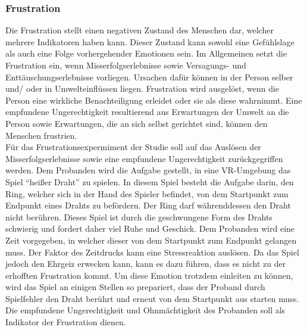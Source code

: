 \subsubsection{Frustration} \label{frust-4}




Die Frustration stellt einen negativen Zustand des Menschen dar, welcher mehrere Indikatoren haben kann. Dieser Zustand kann sowohl eine Gefühlslage als auch eine Folge vorhergehender Emotionen sein.
Im Allgemeinen setzt die Frustration ein, wenn Misserfolgserlebnisse sowie Versagungs- und Enttäuschungserlebnisse vorliegen. Ursachen dafür können in der Person selber und/ oder in Umwelteinflüssen liegen. 
Frustration wird ausgelöst, wenn die Person eine wirkliche Benachteiligung erleidet oder sie als diese wahrnimmt. Eine empfundene Ungerechtigkeit resultierend aus Erwartungen der Umwelt an die Person sowie Erwartungen, die an sich selbst gerichtet sind, können den Menschen frustrien. \\

Für das Frustrationsexpermiment der Studie soll auf das Auslösen der Misserfolgserlebnisse sowie eine empfundene Ungerechtigkeit zurückgegriffen werden.
Dem Probanden wird die Aufgabe gestellt, in eine VR-Umgebung das Spiel ``heißer Draht'' zu spielen. In diesem Spiel besteht die Aufgabe darin, den Ring, welcher sich in der Hand des Spieler befindet, von dem Startpunkt zum Endpunkt eines Drahts zu befördern. Der Ring darf währenddessen den Draht nicht berühren.
Dieses Spiel ist durch die geschwungene Form des Drahts schwierig und fordert daher viel Ruhe und Geschick. 
Dem Probanden wird eine Zeit vorgegeben, in welcher dieser von dem Startpunkt zum Endpunkt gelangen muss. 
Der Faktor des Zeitdrucks kann eine Stressreaktion auslösen. Da das Spiel jedoch den Ehrgeiz erwecken kann, kann es dazu führen, dass es nicht zu der erhofften Frustration kommt. Um diese Emotion trotzdem einleiten zu können, wird das Spiel an einigen Stellen so prepariert, dass der Proband durch Spielfehler den Draht berührt und erneut von dem Startpunkt aus starten muss. Die empfundene Ungerechtigkeit und Ohnmächtigkeit des Probanden soll als Indikator der Frustration dienen. 